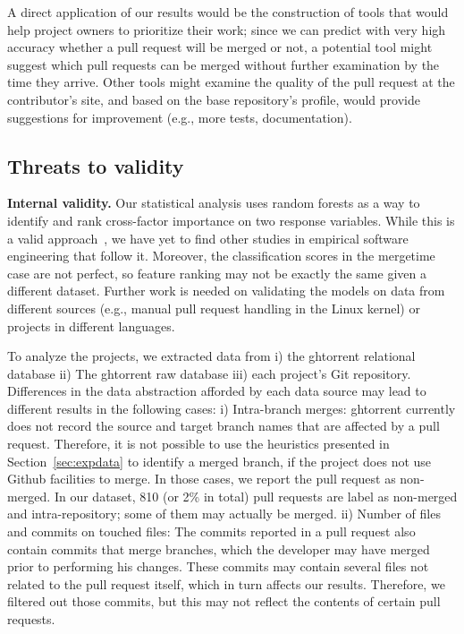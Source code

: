 \documentclass{acm_proc_article-sp}
\begin{document}

A direct application of our results would be the construction of tools that
would help project owners to prioritize their work; since we can predict
with very high accuracy whether a pull request will be merged or not, a
potential tool might suggest which pull requests can be merged without further
examination by the time they arrive. Other tools might examine the quality of
the pull request at the contributor's site, and based on the base repository's
profile, would provide suggestions for improvement (e.g., more tests,
documentation). 

\subsection{Threats to validity}

\textbf{Internal validity.} Our statistical analysis uses random forests as a way
to identify and rank cross-factor importance on two response variables. While
this is a valid approach~\cite{Genue10}, we have yet to find other studies in
empirical software engineering that follow it. Moreover, the classification
scores in the \textsf{mergetime} case are not perfect, so feature ranking may
not be exactly the same given a different dataset. Further work is needed on
validating the models on data from different sources (e.g., manual pull
request handling in the Linux kernel) or projects in different languages. 

To analyze the projects, we extracted data from i) the {\sc ght}orrent relational
database ii) The {\sc ght}orrent raw database iii) each project's Git repository.
Differences in the data abstraction afforded by each data source may
lead to different results in the following cases: 
i) Intra-branch merges: {\sc ght}orrent currently does not record the source
    and target branch names that are affected by a pull request. Therefore, it
    is not possible to use the heuristics presented in
    Section~\ref{sec:expdata} to identify a merged branch, if the project
    does not use Github facilities to merge. In those cases, we
    report the pull request as non-merged. In our dataset, 810 (or 2\% in total)
    pull requests are label as non-merged and intra-repository; some of them may
    actually be merged.
ii) Number of files and commits on touched files: The commits reported
    in a pull request also contain commits that merge branches, which the
    developer may have merged prior to performing his changes. These commits
    may contain several files not related to the pull request itself, which
    in turn affects our results. Therefore, we  
    filtered out those commits, but this may not reflect the contents of 
    certain pull requests.
\end{document}
